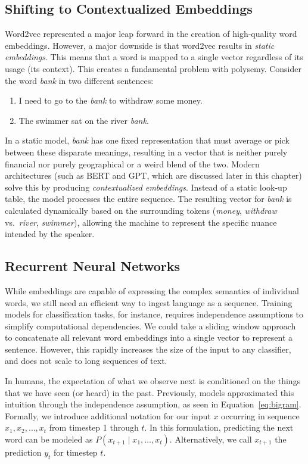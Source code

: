 \subsection{Shifting to Contextualized Embeddings}
Word2vec represented a major leap forward in the creation of high-quality word embeddings. However, a major downside is that word2vec results in \textit{static embeddings}. This means that a word is mapped to a single vector regardless of its usage (its context). This creates a fundamental problem with polysemy. Consider the word \textit{bank} in two different sentences:
\begin{enumerate}
    \item I need to go to the \textit{bank} to withdraw some money.
    \item The swimmer sat on the river \textit{bank}.
\end{enumerate}
In a static model, \textit{bank} has one fixed representation that must average or pick between these disparate meanings, resulting in a vector that is neither purely financial nor purely geographical or a weird blend of the two. Modern architectures (such as BERT and GPT, which are discussed later in this chapter) solve this by producing \textit{contextualized embeddings}. Instead of a static look-up table, the model processes the entire sequence. The resulting vector for \textit{bank} is calculated dynamically based on the surrounding tokens (\textit{money}, \textit{withdraw} vs.\  \textit{river}, \textit{swimmer}), allowing the machine to represent the specific nuance intended by the speaker.


\subsection{Recurrent Neural Networks}
While embeddings are capable of expressing the complex semantics of individual words, we still need an efficient way to ingest language as a sequence. Training models for classification tasks, for instance,  requires independence assumptions to simplify computational dependencies. We could take a sliding window approach to concatenate all relevant word embeddings into a single vector to represent a sentence. However, this rapidly increases the size of the input to any classifier, and  does not scale to long sequences of text. 

In humans, the expectation of what we observe next is conditioned on the things that we have seen (or heard) in the past. Previously, models approximated this intuition through the independence assumption, as seen in Equation~\ref{eq:bigram}. Formally, we introduce additional notation for our input $x$ occurring in sequence $x_1, x_2, \dots, x_t$ from timestep 1 through $t$. In this formulation,  predicting the next word can be modeled as $P(x_{t+1} \mid x_1, \dots, x_t)$. Alternatively, we call $x_{t+1}$ the prediction $y_{t}$ for timestep $t$. 


